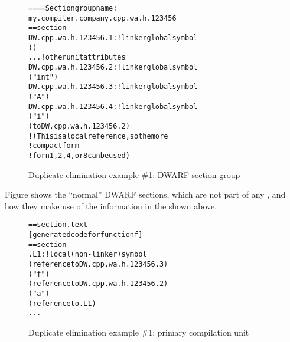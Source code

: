 \begin{figure}
\begin{dwflisting}
\begin{alltt}
==== Section group name:
    my.compiler.company.cpp.wa.h.123456
== section 
DW.cpp.wa.h.123456.1:     ! linker global symbol
        ()
        ...  ! other unit attributes
DW.cpp.wa.h.123456.2:     ! linker global symbol
        ("int")
DW.cpp.wa.h.123456.3:     ! linker global symbol
        ("A")
DW.cpp.wa.h.123456.4:     ! linker global symbol
        ("i")
        ( to DW.cpp.wa.h.123456.2)
            ! (This is a local reference, so the more
            ! compact form  
            ! for n 1,2,4, or 8 can be used)
\end{alltt}
\end{dwflisting}
\vspace{2mm}
\caption{Duplicate elimination example \#1: DWARF section group} 
\label{fig:duplicateeliminationexample1dwarfsectiongroup}
\end{figure}

Figure 
shows the ``normal'' DWARF sections, which are not part of
any , 
and how they make use of the information
in the  shown above.

\begin{figure}
\begin{dwflisting}
\begin{alltt}
== section .text
    [generated code for function f]
== section 
.L1:                           ! local (non-linker) symbol
            (reference to DW.cpp.wa.h.123456.3)
            ("f")
            (reference to DW.cpp.wa.h.123456.2)
                ("a")
                (reference to .L1)
        ...
\end{alltt}
\end{dwflisting}
\caption{Duplicate elimination example \#1: primary compilation unit} 
\label{fig:duplicateeliminationexample1primarycompilationunit}
\end{figure}

